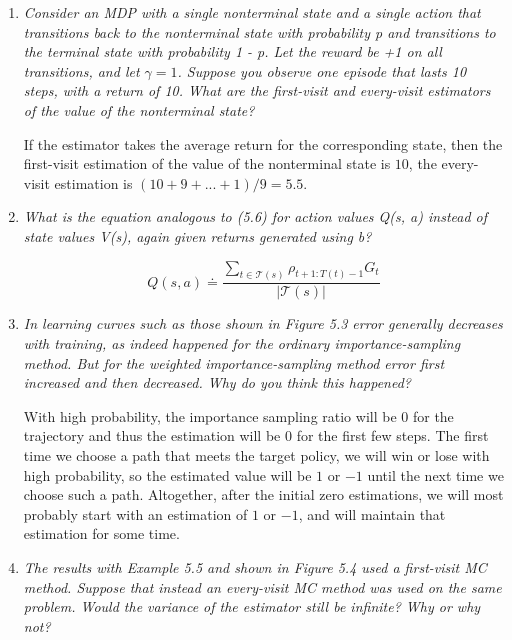 \documentclass[12pt,a4paper]{article}
\begin{document}
\begin{enumerate}
  \item
    \textit{Consider an MDP with a single nonterminal state and a single action
    that transitions back to the nonterminal state with probability p and transitions to the
    terminal state with probability 1 - p. Let the reward be +1 on all transitions, and let
    $\gamma = 1$. Suppose you observe one episode that lasts 10 steps, with a return of 10. What
    are the first-visit and every-visit estimators of the value of the nonterminal state?}

    If the estimator takes the average return for the corresponding state, then the
    first-visit estimation of the value of the nonterminal state is $10$, the every-visit
    estimation is $(10 + 9 + ... + 1)/9 = 5.5$.

  \item
    \textit{What is the equation analogous to (5.6) for action values Q(s, a) instead of
    state values V(s), again given returns generated using b?}

    \[Q(s, a) \doteq \frac{\sum \limits_{t \in \mathcal{T}(s)} \rho_{t + 1:T(t) - 1}G_t}{
    |\mathcal{T}(s)|}\]

  \item
    \textit{In learning curves such as those shown in Figure 5.3 error generally decreases
    with training, as indeed happened for the ordinary importance-sampling method. But for
    the weighted importance-sampling method error first increased and then decreased. Why
    do you think this happened?}

    With high probability, the importance sampling ratio will be $0$ for the trajectory
    and thus the estimation will be $0$ for the first few steps. The first time we
    choose a path that meets the target policy, we will win or lose with high probability,
    so the estimated value will be $1$ or $-1$ until the next time we choose such a path.
    Altogether, after the initial zero estimations, we will most probably start with an
    estimation of $1$ or $-1$, and will maintain that estimation for some time.

  \item
    \textit{The results with Example 5.5 and shown in Figure 5.4 used a first-visit MC
    method. Suppose that instead an every-visit MC method was used on the same problem.
    Would the variance of the estimator still be infinite? Why or why not?}


\end{enumerate}
\end{document}
